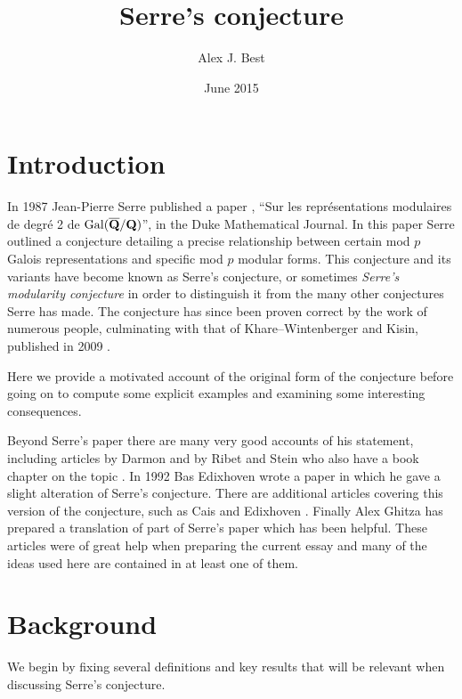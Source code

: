 \documentclass[a4paper,12pt]{article}
\title{\vspace{-40pt}Serre's conjecture}
\author{\vspace{-10pt}Alex J. Best}
\date{June 2015}
\begin{document}
\maketitle
\vspace{-45pt}
\tableofcontents
\clearpage


\section{Introduction}
In 1987 Jean-Pierre Serre published a paper \cite{Serre87}, ``Sur les repr\'esentations modulaires de degr\'e 2 de $\operatorname{Gal}(\overline{\mathbf{Q}}/\mathbf{Q})$'', in the Duke Mathematical Journal.
In this paper Serre outlined a conjecture detailing a precise relationship between certain mod $p$ Galois representations and specific mod $p$ modular forms.
This conjecture and its variants have become known as Serre's conjecture, or sometimes \emph{Serre's modularity conjecture} in order to distinguish it from the many other conjectures Serre has made.
The conjecture has since been proven correct by the work of numerous people, culminating with that of Khare--Wintenberger and Kisin, published in 2009 \cite{KWI,KWII,Kisin}.

Here we provide a motivated account of the original form of the conjecture before going on to compute some explicit examples and examining some interesting consequences.

Beyond Serre's paper there are many very good accounts of his statement, including articles by Darmon \cite{Darmon} and by Ribet and Stein \cite{RibetStein} who also have a book chapter on the topic \cite{RibetSteinBook}.
In 1992 Bas Edixhoven wrote a paper \cite{EdixhovenWeight} in which he gave a slight alteration of Serre's conjecture.
There are additional articles covering this version of the conjecture, such as Cais \cite{Cais} and Edixhoven \cite{Edixhoven}.
Finally Alex Ghitza has prepared a translation of part of Serre's paper \cite{Ghitza} which has been helpful.
These articles were of great help when preparing the current essay and many of the ideas used here are contained in at least one of them.


\section{Background}
We begin by fixing several definitions and key results that will be relevant when discussing Serre's conjecture.
\end{document}
